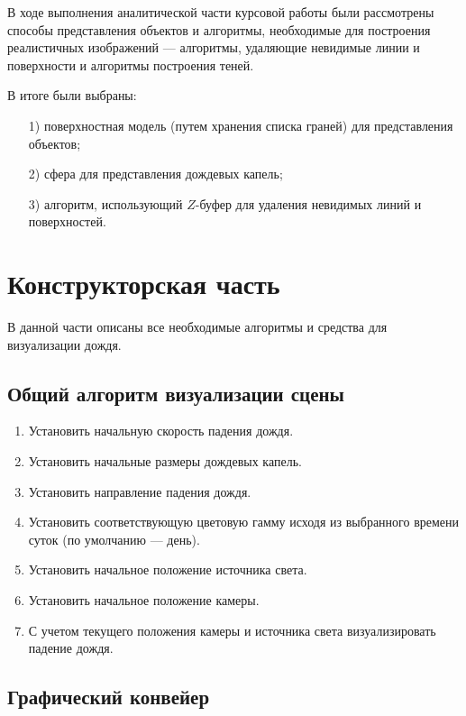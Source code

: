 В ходе выполнения аналитической части курсовой работы были рассмотрены способы представления объектов и алгоритмы, необходимые для построения реалистичных изображений --- алгоритмы, удаляющие невидимые линии и поверхности и алгоритмы построения теней.

В итоге были выбраны:

\begin{enumerate}
\item[1)]
поверхностная модель (путем хранения списка граней) для представления объектов;
\item[2)]
сфера для представления дождевых капель;
\item[3)]
алгоритм, использующий $Z$-буфер для удаления невидимых линий и поверхностей.
\end{enumerate}

\chapter{Конструкторская часть}

В данной части описаны все необходимые алгоритмы и средства для визуализации дождя.

\section{Общий алгоритм визуализации сцены}

\begin{enumerate}
\item
Установить начальную скорость падения дождя.
\item
Установить начальные размеры дождевых капель.
\item
Установить направление падения дождя.
\item
Установить соответствующую цветовую гамму исходя из выбранного времени суток (по умолчанию --- день).
\item
Установить начальное положение источника света.
\item
Установить начальное положение камеры.
\item
С учетом текущего положения камеры и источника света визуализировать падение дождя.
\end{enumerate}

\section{Графический конвейер}

